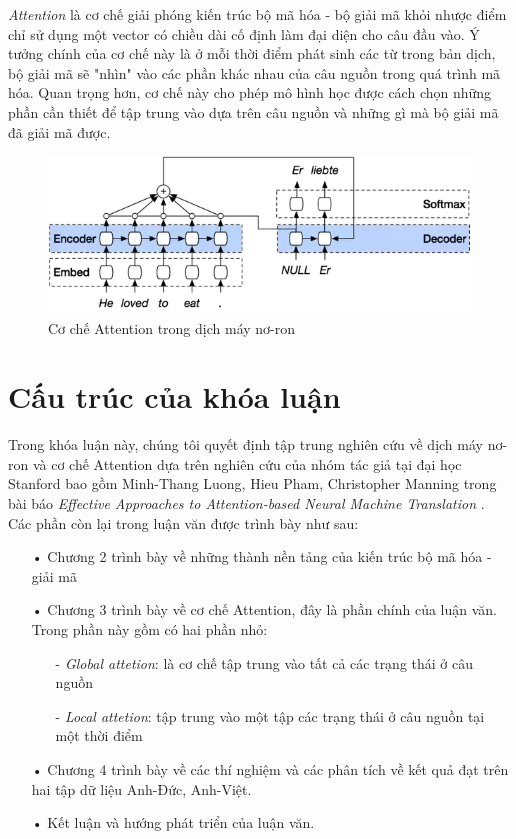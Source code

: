\textit{Attention} là cơ chế giải phóng kiến trúc bộ mã hóa - bộ giải mã khỏi nhược điểm chỉ sử dụng một vector có chiều dài cố định làm đại diện cho câu đầu vào. Ý tưởng chính của cơ chế này là ở mỗi thời điểm phát sinh các từ trong bản dịch, bộ giải mã sẽ "nhìn" vào các phần khác nhau của câu nguồn trong quá trình mã hóa. Quan trọng hơn, cơ chế này cho phép mô hình học được cách chọn những phần cần thiết để tập trung vào dựa trên câu nguồn và những gì mà bộ giải mã đã giải mã được.

\begin{figure}
	\centering
	\includegraphics[width=\textwidth]{intro2attention}
	\caption[Cơ chế Attention trong dịch máy nơ-ron]{Cơ chế Attention trong dịch máy nơ-ron}
	\label{fig_introattention}
\end{figure} 

\section{Cấu trúc của khóa luận}
Trong khóa luận này, chúng tôi quyết định tập trung nghiên cứu về dịch máy nơ-ron và cơ chế Attention dựa trên nghiên cứu của nhóm tác giả tại đại học Stanford bao gồm Minh-Thang Luong, Hieu Pham, Christopher Manning trong bài báo \textit{Effective Approaches to Attention-based Neural Machine Translation} \cite{mainpaper}. Các phần còn lại trong luận văn được trình bày như sau:

\begin{itemize}
	\item[•] Chương 2 trình bày về những thành nền tảng của kiến trúc bộ mã hóa - giải mã
	
	\item[•] Chương 3 trình bày về cơ chế Attention, đây là phần chính của luận văn. Trong phần này gồm có hai phần nhỏ:
		\begin{itemize}
			\item[-] \textit{Global attetion}: là cơ chế tập trung vào tất cả các trạng thái ở câu nguồn
			\item[-] \textit{Local attetion}: tập trung vào một tập các trạng thái ở câu nguồn tại một thời điểm
		\end{itemize}
	\item[•] Chương 4 trình bày về các thí nghiệm và các phân tích về kết quả đạt trên hai tập dữ liệu Anh-Đức, Anh-Việt.
	\item[•] Kết luận và hướng phát triển của luận văn.
\end{itemize}






